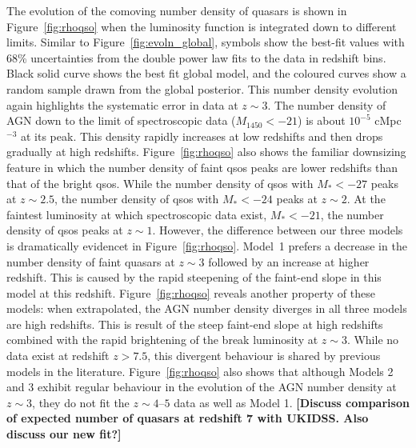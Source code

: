 \documentclass[a4paper,fleqn,usenatbib]{mnras}
\newcommand{\gk}[1]{{\bf \color{notecolor} [#1]}}
\begin{document}
The evolution of the comoving number density of quasars is shown in
Figure~\ref{fig:rhoqso} when the luminosity function is integrated
down to different limits.  Similar to Figure~\ref{fig:evoln_global},
symbols show the best-fit values with 68\% uncertainties from the
double power law fits to the data in redshift bins.  Black solid curve
shows the best fit global model, and the coloured curves show a random
sample drawn from the global posterior.  This number density evolution
again highlights the systematic error in data at $z\sim 3$.  The
number density of AGN down to the limit of spectroscopic data
($M_{1450}<-21$) is about $10^{-5}$ cMpc$^{-3}$ at its peak.  This
density rapidly increases at low redshifts and then drops gradually at
high redshifts.  Figure~\ref{fig:rhoqso} also shows the familiar
downsizing feature in which the number density of faint qsos peaks are
lower redshifts than that of the bright qsos.  While the number
density of qsos with $M_*<-27$ peaks at $z\sim 2.5$, the number
density of qsos with $M_*<-24$ peaks at $z\sim 2$.  At the faintest
luminosity at which spectroscopic data exist, $M_*<-21$, the number
density of qsos peaks at $z\sim 1$.  However, the difference between
our three models is dramatically evidencet in Figure~\ref{fig:rhoqso}.
Model~1 prefers a decrease in the number density of faint quasars at
$z\sim 3$ followed by an increase at higher redshift.  This is caused
by the rapid steepening of the faint-end slope in this model at this
redshift.  Figure~\ref{fig:rhoqso} reveals another property of these
models: when extrapolated, the AGN number density diverges in all
three models are high redshifts.  This is result of the steep
faint-end slope at high redshifts combined with the rapid brightening
of the break luminosity at $z\sim 3$.  While no data exist at redshift
$z>7.5$, this divergent behaviour is shared by previous models in the
literature.  Figure~\ref{fig:rhoqso} also shows that although Models 2
and 3 exhibit regular behaviour in the evolution of the AGN number
density at $z\sim 3$, they do not fit the $z\sim 4$--$5$ data as well
as Model 1.  \gk{Discuss comparison of expected number of quasars at
  redshift 7 with UKIDSS.  Also discuss our new fit?}
\end{document}
